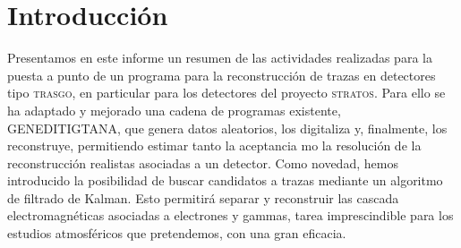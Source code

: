 \documentclass[a4paper]{article}
\let\vec\mathbf  %
\begin{document}

\section{Introducción}

Presentamos en este informe un resumen de las actividades realizadas para la puesta a punto de un programa para la reconstrucción de trazas en detectores tipo \textsc{trasgo}, en particular para los detectores del proyecto \textsc{stratos}. Para ello se ha adaptado y mejorado una cadena de programas existente, GENEDITIGTANA, que genera datos aleatorios, los digitaliza y, finalmente, los reconstruye, permitiendo estimar tanto la aceptancia mo la resolución de la reconstrucción realistas asociadas a un detector. Como novedad, hemos introducido la posibilidad de buscar candidatos a trazas mediante un algoritmo de filtrado de Kalman. Esto permitirá separar y reconstruir las cascada electromagnéticas asociadas a electrones y gammas, tarea imprescindible para los estudios atmosféricos que pretendemos, con una gran eficacia.
\end{document}
